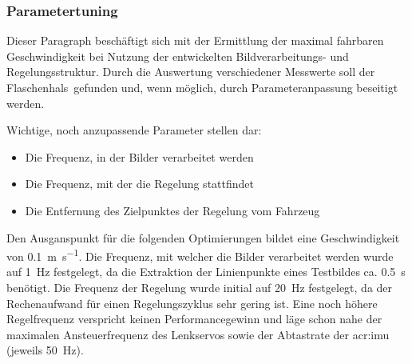 \subsubsection{Parametertuning \dcsecondauthorshort}
Dieser Paragraph beschäftigt sich mit der Ermittlung der maximal fahrbaren Geschwindigkeit bei Nutzung der entwickelten Bildverarbeitungs- und Regelungsstruktur. Durch die Auswertung verschiedener Messwerte soll der \glqq Flaschenhals\grqq\ gefunden und, wenn möglich, durch Parameteranpassung beseitigt werden.

Wichtige, noch anzupassende Parameter stellen dar:
\begin{itemize}
\item Die Frequenz, in der Bilder verarbeitet werden
\item Die Frequenz, mit der die Regelung stattfindet
\item Die Entfernung des Zielpunktes der Regelung vom Fahrzeug
\end{itemize}

Den Ausganspunkt für die folgenden Optimierungen bildet eine Geschwindigkeit von
\SI{0.1}{\metre\per\second}. Die Frequenz, mit welcher die Bilder verarbeitet werden wurde auf \SI{1}{\hertz} festgelegt, da die Extraktion der Linienpunkte eines Testbildes ca. \SI{0.5}{\second} benötigt. Die Frequenz der Regelung wurde initial auf \SI{20}{\hertz} festgelegt, da der Rechenaufwand für einen Regelungszyklus sehr gering ist. Eine noch höhere Regelfrequenz verspricht keinen Performancegewinn und läge schon nahe der maximalen Ansteuerfrequenz des Lenkservos sowie der Abtastrate der \gls{acr:imu} (jeweils \SI{50}{\hertz}).

